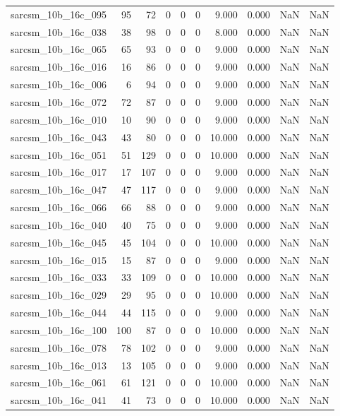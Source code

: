 \documentclass{article}
\begin{document}
\begin{longtable}{lrrrrrrrrr}
sarcsm\_10b\_16c\_095 & 95 & 72 & 0 & 0 & 0 & 9.000 & 0.000 & NaN & NaN \\
sarcsm\_10b\_16c\_038 & 38 & 98 & 0 & 0 & 0 & 8.000 & 0.000 & NaN & NaN \\
sarcsm\_10b\_16c\_065 & 65 & 93 & 0 & 0 & 0 & 9.000 & 0.000 & NaN & NaN \\
sarcsm\_10b\_16c\_016 & 16 & 86 & 0 & 0 & 0 & 9.000 & 0.000 & NaN & NaN \\
sarcsm\_10b\_16c\_006 & 6 & 94 & 0 & 0 & 0 & 9.000 & 0.000 & NaN & NaN \\
sarcsm\_10b\_16c\_072 & 72 & 87 & 0 & 0 & 0 & 9.000 & 0.000 & NaN & NaN \\
sarcsm\_10b\_16c\_010 & 10 & 90 & 0 & 0 & 0 & 9.000 & 0.000 & NaN & NaN \\
sarcsm\_10b\_16c\_043 & 43 & 80 & 0 & 0 & 0 & 10.000 & 0.000 & NaN & NaN \\
sarcsm\_10b\_16c\_051 & 51 & 129 & 0 & 0 & 0 & 10.000 & 0.000 & NaN & NaN \\
sarcsm\_10b\_16c\_017 & 17 & 107 & 0 & 0 & 0 & 9.000 & 0.000 & NaN & NaN \\
sarcsm\_10b\_16c\_047 & 47 & 117 & 0 & 0 & 0 & 9.000 & 0.000 & NaN & NaN \\
sarcsm\_10b\_16c\_066 & 66 & 88 & 0 & 0 & 0 & 9.000 & 0.000 & NaN & NaN \\
sarcsm\_10b\_16c\_040 & 40 & 75 & 0 & 0 & 0 & 9.000 & 0.000 & NaN & NaN \\
sarcsm\_10b\_16c\_045 & 45 & 104 & 0 & 0 & 0 & 10.000 & 0.000 & NaN & NaN \\
sarcsm\_10b\_16c\_015 & 15 & 87 & 0 & 0 & 0 & 9.000 & 0.000 & NaN & NaN \\
sarcsm\_10b\_16c\_033 & 33 & 109 & 0 & 0 & 0 & 10.000 & 0.000 & NaN & NaN \\
sarcsm\_10b\_16c\_029 & 29 & 95 & 0 & 0 & 0 & 10.000 & 0.000 & NaN & NaN \\
sarcsm\_10b\_16c\_044 & 44 & 115 & 0 & 0 & 0 & 9.000 & 0.000 & NaN & NaN \\
sarcsm\_10b\_16c\_100 & 100 & 87 & 0 & 0 & 0 & 10.000 & 0.000 & NaN & NaN \\
sarcsm\_10b\_16c\_078 & 78 & 102 & 0 & 0 & 0 & 9.000 & 0.000 & NaN & NaN \\
sarcsm\_10b\_16c\_013 & 13 & 105 & 0 & 0 & 0 & 9.000 & 0.000 & NaN & NaN \\
sarcsm\_10b\_16c\_061 & 61 & 121 & 0 & 0 & 0 & 10.000 & 0.000 & NaN & NaN \\
sarcsm\_10b\_16c\_041 & 41 & 73 & 0 & 0 & 0 & 10.000 & 0.000 & NaN & NaN \\

\end{longtable}
\end{document}

